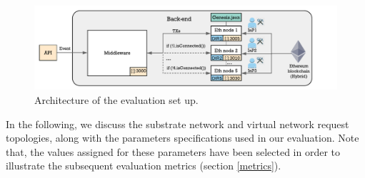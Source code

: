 \begin{figure}[bth]
	\centering
	\includegraphics[width=1\linewidth]{gfx/Evaluation_scenario}    
  	\caption{Architecture of the evaluation set up.}
  	\label{fig:ev_scenario}
\end{figure}

In the following, we discuss the substrate network and virtual network request topologies, along with the parameters specifications used in our evaluation. Note that, the values assigned for these parameters have been selected in order to illustrate the subsequent evaluation metrics (section \ref{metrics}).

